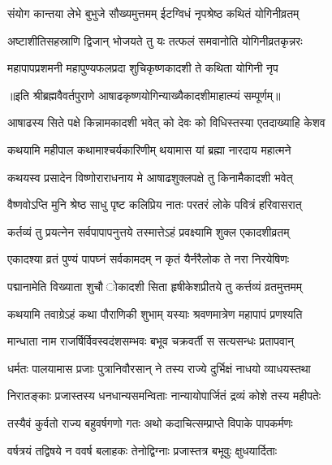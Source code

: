 \twolineshloka
{संयोग कान्तया लेभे बुभुजे सौख्यमुत्तमम्}
{ईटग्विधं नृपश्रेष्ठ कथितं योगिनीव्रतम्} %

\twolineshloka
{अष्टाशीतिसहस्राणि द्विजान् भोजयते तु यः}
{तत्फलं समवानोति योगिनीव्रतकृन्नरः} %

\twolineshloka
{महापापप्रशमनी महापुण्यफलप्रदा}
{शुचिकृष्णकादशी ते कथिता योगिनी नृप} %

॥इति श्रीब्रह्मवैवर्तपुराणे आषाढकृष्णयोगिन्याख्यैकादशीमाहात्म्यं सम्पूर्णम्॥



\twolineshloka
{आषाढस्य सिते पक्षे किन्नामकादशी भवेत्}
{को देवः को विधिस्तस्या एतदाख्याहि केशव} %


\twolineshloka
{कथयामि महीपाल कथामाश्चर्यकारिणीम्}
{थयामास यां ब्रह्मा नारदाय महात्मने} %


\twolineshloka
{कथयस्व प्रसादेन विष्णोराराधनाय मे}
{आषाढशुक्लपक्षे तु किनामैकादशी भवेत्} %


\twolineshloka
{वैष्णवोऽप्ति मुनि श्रेष्ठ साधु पृष्ट कलिप्रिय}
{नातः परतरं लोके पवित्रं हरिवासरात्} %

\twolineshloka
{कर्तव्यं तु प्रयत्नेन सर्वपापापनुत्तये}
{तस्मात्तेऽहं प्रवक्ष्यामि शुक्ल एकादशीव्रतम्} %

\twolineshloka
{एकादश्या व्रतं पुण्यं पापघ्नं सर्वकामदम्}
{न कृतं यैर्नरैलोक ते नरा निरयेषिणः} %

\twolineshloka
{पद्मानामेति विख्याता शुचौ ोकादशी सिता}
{हृषीकेशप्रीतये तु कर्त्तव्यं व्रतमुत्तमम्} %

\twolineshloka
{कथयामि तवाग्रेऽहं कथा पौराणिकी शुभाम्}
{यस्याः श्रवणमात्रेण महापापं प्रणश्यति} %

\twolineshloka
{मान्धाता नाम राजर्षिर्विवस्वदंशसम्भवः}
{बभूव चक्रवर्ती स सत्यसन्धः प्रतापवान्} %

\twolineshloka
{धर्मतः पालयामास प्रजाः पुत्रानिवौरसान्}
{ने तस्य राज्ये दुर्भिक्षं नाधयो व्याधयस्तथा} %

\twolineshloka
{निरातङ्काः प्रजास्तस्य धनधान्यसमन्विताः}
{नान्यायोपार्जितं द्रव्यं कोशे तस्य महीपतेः} %

\twolineshloka
{तस्यैवं कुर्वतो राज्य बहुवर्षगणो गतः}
{अथो कदाचित्सम्प्राप्ते विपाके पापकर्मणः} %

\twolineshloka
{वर्षत्रयं तद्विषये न ववर्ष बलाहकः}
{तेनोद्विग्नाः प्रजास्तत्र बभूवुः क्षुधयार्दिताः} %

